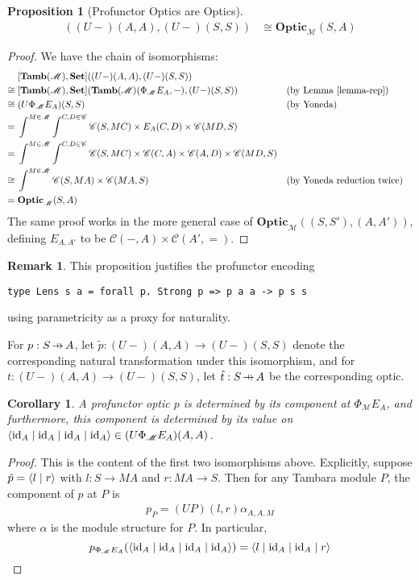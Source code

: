 \documentclass[11pt,a4paper]{article}
\theoremstyle{plain}
\newtheorem{proposition}[theorem]{Proposition}
\newtheorem{corollary}[theorem]{Corollary}
\theoremstyle{definition}
\newtheorem{remark}[theorem]{Remark}
\newcommand{\C}{\mathscr{C}}
\newcommand{\M}{\mathscr{M}}
\newcommand{\Pastro}{\Phi}
\newcommand{\Set}{\mathbf{Set}}
\newcommand{\Tamb}{\mathbf{Tamb}}
\newcommand{\Optic}{\mathbf{Optic}}
\newcommand{\id}{\mathrm{id}}
\newcommand{\rep}[2]{{\ensuremath \left\langle #1 \mid #2 \right\rangle}}
\newcommand{\repfour}[4]{{\ensuremath \langle #1 \mid #2 \mid #3 \mid #4 \rangle}}
\newcommand{\hto}{\ensuremath{\,\mathaccent\shortmid\rightarrow\,}}
\begin{document}
\begin{proposition}[Profunctor Optics are Optics]\label{prop-profunctor-optics-are-optics}
  \begin{align*}
    [\Tamb(\M), \Set]((U-)(A,A),(U-)(S,S)) &\cong \Optic_\M(S, A)
  \end{align*}
\end{proposition}
\begin{proof}
  We have the chain of isomorphisms:
  \begin{align*}
    &[\Tamb(\M), \Set]((U-)(A,A),(U-)(S,S)) \\
    \cong \;&[\Tamb(\M), \Set](\Tamb(\M)(\Pastro_\M E_A, -), (U-)(S,S))  && \text{(by Lemma \ref{lemma-rep})}\\
    \cong \;&(U\Pastro_\M E_A)(S,S)  && \text{(by Yoneda)} \\
    = \;&\int^{M \in \M} \int^{C,D \in \C} \C(S, MC) \times E_A(C,D) \times \C(MD,S) \\
    = \;&\int^{M \in \M} \int^{C,D \in \C} \C(S, MC) \times \C(C,A) \times \C(A,D) \times \C(MD,S) \\
    \cong \;&\int^{M \in \M} \C(S, MA) \times \C(MA, S)  && \text{(by Yoneda reduction twice)} \\
    = \;&\Optic_\M(S, A)
  \end{align*}
  The same proof works in the more general case of $\Optic_\M((S, S'), (A,A'))$, defining $E_{A, A'}$ to be $\C(-, A) \times \C(A', {=})$.
\end{proof}

\begin{remark}
  This proposition justifies the profunctor encoding
\begin{verbatim}
type Lens s a = forall p. Strong p => p a a -> p s s
\end{verbatim}
  using parametricity as a proxy for naturality.
\end{remark}

For $p : S \hto A$, let $\tilde{p} : (U-)(A,A) \rightarrow (U-)(S,S)$ denote the corresponding natural transformation under this isomorphism, and for $t : (U-)(A,A) \rightarrow (U-)(S,S)$, let $\hat{t} : S \hto A$ be the corresponding optic.

\begin{corollary}
  A profunctor optic $p$ is determined by its component at $\Pastro_\M E_A$, and furthermore, this component is determined by its value on $\repfour{\id_A}{\id_A}{\id_A}{\id_A } \in (U \Pastro_\M E_A)(A, A)$.
\end{corollary}
\begin{proof}
  This is the content of the first two isomorphisms above. Explicitly, suppose $\hat{p} = \rep{l}{r }$ with $l : S \to MA$ and $r : MA \to S$. Then for any Tambara module $P$, the component of $p$ at $P$ is
  \begin{align*}
    p_P = (UP)(l,r) \alpha_{A,A,M}
  \end{align*}
  where $\alpha$ is the module structure for $P$. In particular,
  \[
    p_{\Pastro_\M E_A}(\repfour{\id_A}{\id_A}{\id_A}{\id_A }) = \repfour{l}{\id_A}{\id_A}{r }
  \]
\end{proof}
\end{document}
